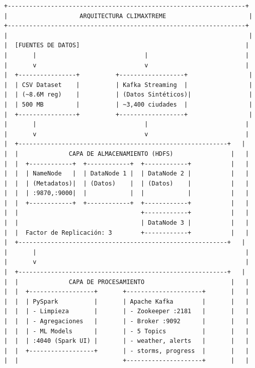 \documentclass[12pt,a4paper]{scrartcl}
\begin{document}
\begin{verbatim}
+------------------------------------------------------------------+
|                    ARQUITECTURA CLIMAXTREME                       |
+------------------------------------------------------------------+
|                                                                   |
|  [FUENTES DE DATOS]                                              |
|       |                              |                           |
|       v                              v                           |
|  +----------------+          +------------------+                 |
|  | CSV Dataset    |          | Kafka Streaming  |                 |
|  | (~8.6M reg)    |          | (Datos Sintéticos)|                |
|  | 500 MB         |          | ~3,400 ciudades  |                 |
|  +----------------+          +------------------+                 |
|       |                              |                           |
|       v                              v                           |
|  +----------------------------------------------------------+   |
|  |              CAPA DE ALMACENAMIENTO (HDFS)                |   |
|  |  +------------+  +------------+  +------------+           |   |
|  |  | NameNode   |  | DataNode 1 |  | DataNode 2 |           |   |
|  |  | (Metadatos)|  | (Datos)    |  | (Datos)    |           |   |
|  |  | :9870,:9000|  |            |  |            |           |   |
|  |  +------------+  +------------+  +------------+           |   |
|  |                                  +------------+           |   |
|  |                                  | DataNode 3 |           |   |
|  |  Factor de Replicación: 3        +------------+           |   |
|  +----------------------------------------------------------+   |
|       |                                                          |
|       v                                                          |
|  +----------------------------------------------------------+   |
|  |              CAPA DE PROCESAMIENTO                        |   |
|  |  +------------------+       +---------------------+       |   |
|  |  | PySpark          |       | Apache Kafka        |       |   |
|  |  | - Limpieza       |       | - Zookeeper :2181   |       |   |
|  |  | - Agregaciones   |       | - Broker :9092      |       |   |
|  |  | - ML Models      |       | - 5 Topics          |       |   |
|  |  | :4040 (Spark UI) |       | - weather, alerts   |       |   |
|  |  +------------------+       | - storms, progress  |       |   |
|  |                             +---------------------+       |   |

\end{verbatim}
\end{document}
